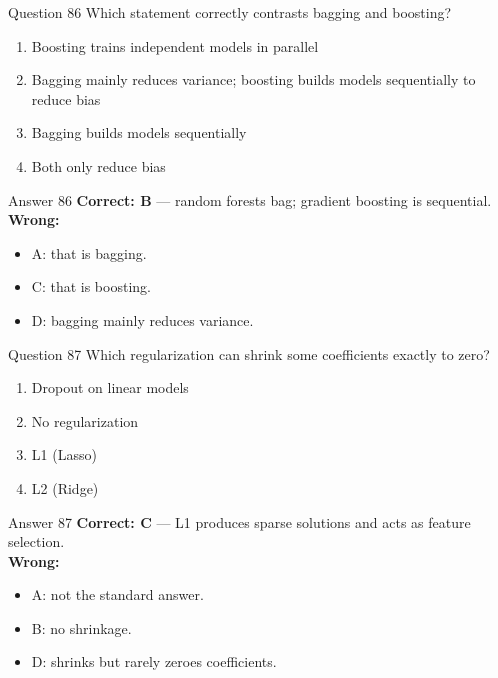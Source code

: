 \documentclass[aspectratio=169,11pt]{beamer}
\begin{document}
	\begin{frame}{Question 86}
		Which statement correctly contrasts bagging and boosting?
		\begin{enumerate}[label=\Alph*.]
			\item Boosting trains independent models in parallel
			\item Bagging mainly reduces variance; boosting builds models sequentially to reduce bias
			\item Bagging builds models sequentially
			\item Both only reduce bias
		\end{enumerate}
	\end{frame}
	\begin{frame}{Answer 86}
		\textbf{Correct: B} --- random forests bag; gradient boosting is sequential.\\
		\vspace{0.5em}
		\textbf{Wrong:}
		\begin{itemize}
			\item A: that is bagging.
			\item C: that is boosting.
			\item D: bagging mainly reduces variance.
		\end{itemize}
	\end{frame}
	
	\begin{frame}{Question 87}
		Which regularization can shrink some coefficients exactly to zero?
		\begin{enumerate}[label=\Alph*.]
			\item Dropout on linear models
			\item No regularization
			\item L1 (Lasso)
			\item L2 (Ridge)
		\end{enumerate}
	\end{frame}
	\begin{frame}{Answer 87}
		\textbf{Correct: C} --- L1 produces sparse solutions and acts as feature selection.\\
		\vspace{0.5em}
		\textbf{Wrong:}
		\begin{itemize}
			\item A: not the standard answer.
			\item B: no shrinkage.
			\item D: shrinks but rarely zeroes coefficients.
		\end{itemize}
	\end{frame}
	
\end{document}
